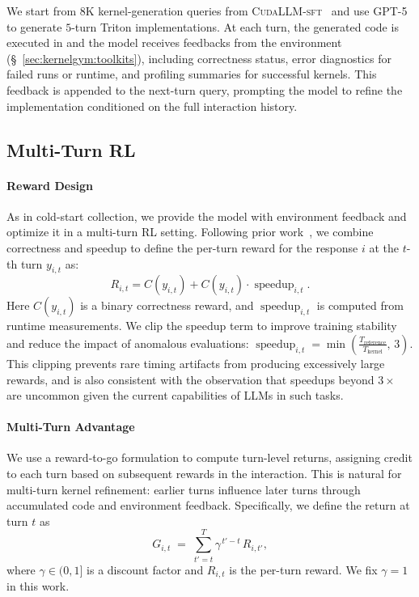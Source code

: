We start from $8$K kernel-generation queries from \textsc{CudaLLM-sft}~\citep{cudallm2025}
and use GPT-5 to generate $5$-turn Triton implementations. At each turn, the generated code is executed in \env{} and the model receives feedbacks from the environment (\S~\ref{sec:kernelgym:toolkits}), including correctness status, error diagnostics for failed runs or runtime, and profiling summaries for successful kernels. This feedback is appended to the next-turn query, prompting the model to refine the implementation conditioned on the full interaction history.

\subsection{Multi-Turn RL}
\label{sec:multi-turn-rl}
\paragraph{Reward Design}
As in cold-start collection, we provide the model with environment feedback and optimize it in a multi-turn RL setting. Following prior work~\citep{baronio2025kevinmultiturnrlgenerating,woo2025tritonrltrainingllmsthink}, we combine correctness and speedup to define the per-turn reward for the response $i$ at the $t$-th turn $y_{i,t}$ as:
\begin{equation}
\label{eq:speedup-rewards}
R_{i,t} = C(y_{i,t}) + C(y_{i,t}) \cdot \operatorname{speedup}_{i,t}.    
\end{equation}
Here $C(y_{i,t})$ is a binary correctness reward, and $\operatorname{speedup}_{i,t}$ is computed from runtime measurements. We clip the speedup term to improve training stability and reduce the impact of anomalous evaluations:
\(
\operatorname{speedup}_{i,t}=\min\!\left(\frac{T_{\text{reference}}}{T_{\text{kernel}}},\, 3\right).
\)
This clipping prevents rare timing artifacts from producing excessively large rewards, and is also consistent with the observation that speedups beyond $3\times$ are uncommon given the current capabilities of LLMs in such tasks.

\paragraph{Multi-Turn Advantage}
We use a reward-to-go formulation to compute turn-level returns, assigning credit to each turn based on subsequent rewards in the interaction. This is natural for multi-turn kernel refinement: earlier turns influence later turns through accumulated code and environment feedback. Specifically, we define the return at turn $t$ as
\begin{equation}
G_{i,t} \;=\; \sum_{t'=t}^{T}\gamma^{\,t'-t}\, R_{i,t'} ,
\label{eq:return}
\end{equation}
where $\gamma\in(0,1]$ is a discount factor and $R_{i,t}$ is the per-turn reward. We fix $\gamma=1$ in this work.

